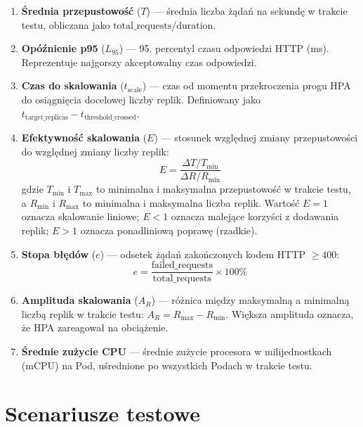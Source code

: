 \begin{enumerate}
  \item \textbf{Średnia przepustowość} ($T$) — średnia liczba żądań na sekundę w trakcie testu, obliczana jako $\text{total\_requests} / \text{duration}$.

  \item \textbf{Opóźnienie p95} ($L_{95}$) — 95. percentyl czasu odpowiedzi HTTP (ms). Reprezentuje najgorszy akceptowalny czas odpowiedzi.

  \item \textbf{Czas do skalowania} ($t_{\text{scale}}$) — czas od momentu przekroczenia progu HPA do osiągnięcia docelowej liczby replik. Definiowany jako $t_{\text{target\_replicas}} - t_{\text{threshold\_crossed}}$.

  \item \textbf{Efektywność skalowania} ($E$) — stosunek względnej zmiany przepustowości do względnej zmiany liczby replik:
  \begin{equation}
    E = \frac{\Delta T / T_{\text{min}}}{\Delta R / R_{\text{min}}}
  \end{equation}
  gdzie $T_{\text{min}}$ i $T_{\text{max}}$ to minimalna i maksymalna przepustowość w trakcie testu, a $R_{\text{min}}$ i $R_{\text{max}}$ to minimalna i maksymalna liczba replik. Wartość $E = 1$ oznacza skalowanie liniowe; $E < 1$ oznacza malejące korzyści z dodawania replik; $E > 1$ oznacza ponadliniową poprawę (rzadkie).

  \item \textbf{Stopa błędów} ($e$) — odsetek żądań zakończonych kodem HTTP $\geq 400$:
  \begin{equation}
    e = \frac{\text{failed\_requests}}{\text{total\_requests}} \times 100\%
  \end{equation}

  \item \textbf{Amplituda skalowania} ($A_R$) — różnica między maksymalną a minimalną liczbą replik w trakcie testu: $A_R = R_{\text{max}} - R_{\text{min}}$. Większa amplituda oznacza, że HPA zareagował na obciążenie.

  \item \textbf{Średnie zużycie CPU} — średnie zużycie procesora w milijednostkach (mCPU) na Pod, uśrednione po wszystkich Podach w trakcie testu.
\end{enumerate}

\section{Scenariusze testowe}

